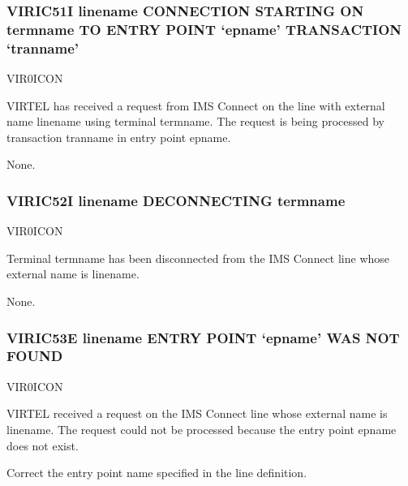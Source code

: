 \documentclass[letterpaper,10pt,english]{sphinxmanual}
\begin{document}
\subsubsection{VIRIC51I linename CONNECTION STARTING ON termname TO ENTRY POINT ‘epname’ TRANSACTION ‘tranname’}
\label{\detokenize{messages:viric51i-linename-connection-starting-on-termname-to-entry-point-epname-transaction-tranname}}\begin{description}
\sphinxAtStartPar
VIR0ICON

\sphinxAtStartPar
VIRTEL has received a request from IMS Connect on the line with external name linename using terminal termname. The request is being processed by transaction tranname in entry point epname.

\sphinxAtStartPar
None.

\end{description}


\subsubsection{VIRIC52I linename DECONNECTING termname}
\label{\detokenize{messages:viric52i-linename-deconnecting-termname}}\begin{description}
\sphinxAtStartPar
VIR0ICON

\sphinxAtStartPar
Terminal termname has been disconnected from the IMS Connect line whose external name is linename.

\sphinxAtStartPar
None.

\end{description}


\subsubsection{VIRIC53E linename ENTRY POINT ‘epname’ WAS NOT FOUND}
\label{\detokenize{messages:viric53e-linename-entry-point-epname-was-not-found}}\begin{description}
\sphinxAtStartPar
VIR0ICON

\sphinxAtStartPar
VIRTEL received a request on the IMS Connect line whose external name is linename. The request could not be processed because the entry point epname does not exist.

\sphinxAtStartPar
Correct the entry point name specified in the line definition.

\end{description}
\end{document}
